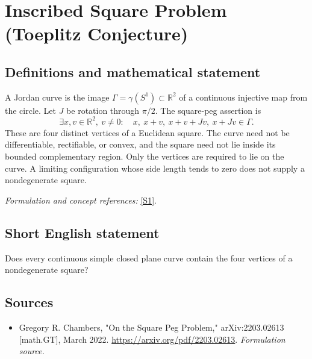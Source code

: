 \documentclass[11pt]{article}
\begin{document}
\section*{\texorpdfstring{Inscribed Square Problem (Toeplitz Conjecture)}{Inscribed Square Problem (Toeplitz Conjecture)}}\label{56}
\subsection{Definitions and mathematical statement}
A Jordan curve is the image $\Gamma=\gamma(S^1)\subset{\mathbb{R}}^2$ of a continuous injective map from the circle. Let $J$ be rotation through $\pi/2$. The square-peg assertion is
\[
 \exists x,v\in{\mathbb{R}}^2,\ v\ne0:\quad
 x,\ x+v,\ x+v+Jv,\ x+Jv\in\Gamma.
\]
These are four distinct vertices of a Euclidean square. The curve need not be differentiable, rectifiable, or convex, and the square need not lie inside its bounded complementary region. Only the vertices are required to lie on the curve. A limiting configuration whose side length tends to zero does not supply a nondegenerate square.
\par\smallskip\textit{Formulation and concept references:} \href{https://arxiv.org/pdf/2203.02613}{[S1]}.

\subsection{Short English statement}
Does every continuous simple closed plane curve contain the four vertices of a nondegenerate square?
\subsection{Sources}
\begin{itemize}
\item[S1]Gregory R. Chambers, "On the Square Peg Problem," arXiv:2203.02613 [math.GT], March 2022.
\url{https://arxiv.org/pdf/2203.02613}.
\textit{Formulation source.}
\end{itemize}
\end{document}
